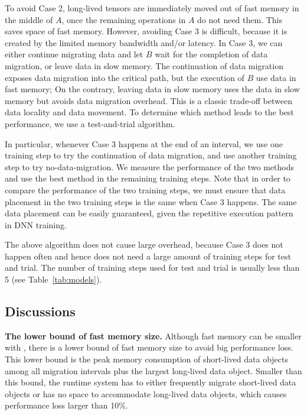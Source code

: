 To avoid Case 2, long-lived tensors are immediately moved out of fast memory in the middle of $A$, once the remaining operations in $A$ do not need them. This saves space of fast memory. However, avoiding Case 3 is difficult, because it is created by the limited memory bandwidth and/or latency. 
In Case 3, we can either continue migrating data and let $B$ wait for the completion of data migration, or leave data in slow memory. The continuation of data migration exposes data migration into the critical path, but the execution of $B$ use data in fast memory; On the contrary, leaving data in slow memory uses the data in slow memory but avoids data migration overhead. This is a classic trade-off between data locality and data movement. To determine which method leads to the best performance, we use a test-and-trial algorithm.

In particular, whenever Case 3 happens at the end of an interval, we use one training step to try the continuation of data migration, and use another training step to try no-data-migration. We measure the performance of the two methods and use the best method in the remaining training steps. Note that in order to compare the performance of the two training steps, we must ensure that data placement in the two training steps is the same when Case 3 happens. The same data placement can be easily guaranteed, given the repetitive execution pattern in DNN training. 

The above algorithm does not cause large overhead, because Case 3 does not happen often and hence does not need a large amount of training steps for test and trial. The number of training steps used for test and trial is usually \textcolor{check}{less than 5}  (see Table~\ref{tab:models}). 






\subsection{Discussions}
\label{sec:discussion}

\textbf{The lower bound of fast memory size.} Although fast memory can be smaller with \name, there is a lower bound of fast memory size to avoid big performance loss. This lower bound is the peak memory consumption of short-lived data objects \textcolor{check}{among all migration intervals} plus the largest long-lived data object. Smaller than this bound, the runtime system has to either frequently migrate short-lived data objects or has no space to accommodate long-lived data objects, which causes performance loss larger than 10\%. 


